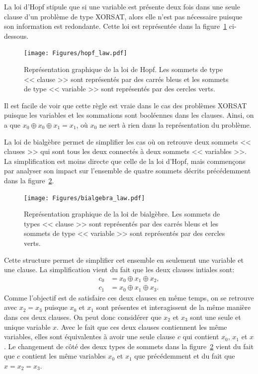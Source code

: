 La loi d'Hopf stipule que si une variable est présente deux fois dans une seule clause d'un problème de type XORSAT, alors elle n'est pas nécessaire puisque son information est redondante.
Cette loi est représentée dans la figure~\ref{fig:hopf-law} ci-dessous.
\begin{figure}[h]
    \centering
    \texttt{[image: Figures/hopf\_law.pdf]}
    \caption[Représentation graphique de la loi de Hopf.]{Représentation graphique de la loi de Hopf. Les sommets de type << clause >> sont représentés par des carrés bleus et les sommets de type << variable >> sont représentés par des cercles verts.}
    \label{fig:hopf-law}
\end{figure}
Il est facile de voir que cette règle est vraie dans le cas des problèmes XORSAT puisque les variables et les sommations sont booléennes dans les clauses.
Ainsi, on a que $x_0 \oplus x_0 \oplus x_1 = x_1$, où $x_0$ ne sert à rien dans la représentation du problème.

La loi de bialgèbre permet de simplifier les cas où on retrouve deux sommets << clauses >> qui sont tous les deux connectés à deux sommets << variables >>.
La simplification est moins directe que celle de la loi d'Hopf, mais commençons par analyser son impact sur l'ensemble de quatre sommets décrits précédemment dans la figure~\ref{fig:bialgebra-law}.
\begin{figure}[h]
    \centering
    \texttt{[image: Figures/bialgebra\_law.pdf]}
    \caption[Représentation graphique de la loi de bialgèbre.]{Représentation graphique de la loi de bialgèbre. Les sommets de types << clause >> sont représentés par des carrés bleus et les sommets de type << variable >> sont représentés par des cercles verts.}
    \label{fig:bialgebra-law}
\end{figure}
Cette structure permet de simplifier cet ensemble en seulement une variable et une clause.
La simplification vient du fait que les deux clauses intiales sont:
\begin{equation}
    \begin{split}
        c_0 &= x_0 \oplus x_1 \oplus x_2,\\
        c_1 &= x_0 \oplus x_1 \oplus x_3.
    \end{split}
\end{equation}
Comme l'objectif est de satisfaire ces deux clauses en même temps, on se retrouve avec $x_2  = x_3$ puisque $x_0$ et $x_1$ sont présentes et interagissent de la même manière dans ces deux clauses.
On peut donc considérer que $x_2$ et $x_3$ sont une seule et unique variable $x$.
Avec le fait que ces deux clauses contiennent les même variables, elles sont équivalentes à avoir une seule clause $c$ qui contient $x_0$, $x_1$ et $x$.
Le changement de côté des deux types de sommets dans la figure~\ref{fig:bialgebra-law} vient du fait que $c$ contient les même variables $x_0$ et $x_1$ que précédemment et du fait que $x = x_2 = x_3$.

